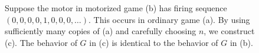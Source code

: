 \begin{centering}
\begin{figure}[tbh]
  \caption{Suppose the motor in motorized game (b) has firing sequence
    $(0,0,0,0,1,0,0,0,\dots)$. This occurs in ordinary game (a). By using
    sufficiently many copies of (a) and carefully choosing $n$, we construct
    (c). The behavior of $G$ in (c) is identical to the behavior of $G$ in
    (b).}
\label{natMot}
\end{figure}
\end{centering}

